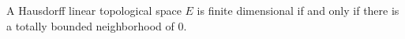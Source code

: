 A Hausdorff linear topological space $E$ is finite dimensional if and only if there is a totally bounded neighborhood of $0$.
